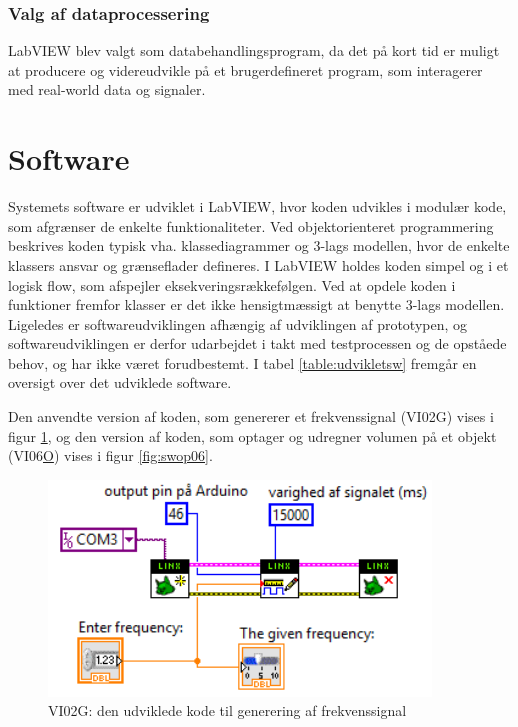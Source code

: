 \subsubsection{Valg af dataprocessering}
LabVIEW blev valgt som databehandlingsprogram, da det på kort tid er muligt at producere og videreudvikle på et brugerdefineret program, som interagerer med real-world data og signaler.

\section{Software}
Systemets software er udviklet i LabVIEW, hvor koden udvikles i modulær kode, som afgrænser de enkelte funktionaliteter. Ved objektorienteret programmering beskrives koden typisk vha. klassediagrammer og 3-lags modellen, hvor de enkelte klassers ansvar og grænseflader defineres. I LabVIEW holdes koden simpel og i et logisk flow, som afspejler eksekveringsrækkefølgen. Ved at opdele koden i funktioner fremfor klasser er det ikke hensigtmæssigt at benytte 3-lags modellen. Ligeledes er softwareudviklingen afhængig af udviklingen af prototypen, og softwareudviklingen er derfor udarbejdet i takt med testprocessen og de opståede behov, og har ikke været forudbestemt. I tabel \ref{table:udvikletsw} fremgår en oversigt over det udviklede software. 

Den anvendte version af koden, som genererer et frekvenssignal (VI02G) vises i figur \ref{fig:swgf02}, og den version af koden, som optager og udregner volumen på et objekt (VI06\underline{O}) vises i figur \ref{fig:swop06}.  

\begin{figure}[htb]
\centering
\includegraphics[width=4in]{genererfrekvenssignal02.PNG}	
\caption{VI02G: den udviklede kode til generering af frekvenssignal}
\label{fig:swgf02}
\end{figure}

